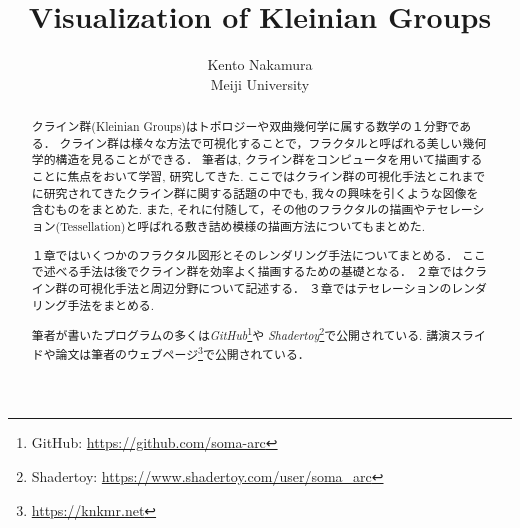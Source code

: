 \documentclass[uplatex, dvipdfmx]{jsarticle}
\title{ Visualization of Kleinian Groups }
\author{ Kento Nakamura\\
Meiji University\\
}
\date{}
\begin{document}
\maketitle

\begin{abstract}
クライン群(Kleinian Groups)はトポロジーや双曲幾何学に属する数学の１分野である．
クライン群は様々な方法で可視化することで，フラクタルと呼ばれる美しい幾何学的構造を見ることができる．
筆者は, クライン群をコンピュータを用いて描画することに焦点をおいて学習, 研究してきた.
ここではクライン群の可視化手法とこれまでに研究されてきたクライン群に関する話題の中でも, 我々の興味を引くような図像を含むものをまとめた.
また, それに付随して，その他のフラクタルの描画やテセレーション(Tessellation)と呼ばれる敷き詰め模様の描画方法についてもまとめた.

１章ではいくつかのフラクタル図形とそのレンダリング手法についてまとめる．
ここで述べる手法は後でクライン群を効率よく描画するための基礎となる．
２章ではクライン群の可視化手法と周辺分野について記述する．
３章ではテセレーションのレンダリング手法をまとめる.

筆者が書いたプログラムの多くは\textit{GitHub}\footnote{GitHub: \url{https://github.com/soma-arc}}や
\textit{Shadertoy}\footnote{Shadertoy: \url{https://www.shadertoy.com/user/soma\_arc}}で公開されている.
講演スライドや論文は筆者のウェブページ\footnote{\url{https://knkmr.net}}で公開されている．

\end{abstract}

\clearpage

\tableofcontents

\clearpage







\printbibliography
\end{document}
